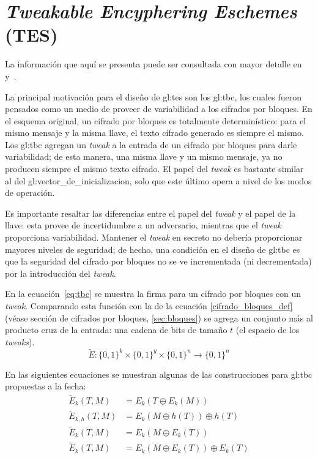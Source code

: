 %
%

\section{\textit{Tweakable Encyphering Eschemes} (TES)}
\label{sec:tes}

La información que aquí se presenta puede ser consultada con mayor detalle en
\cite{cifradores_de_disco} y~\cite{tweaks}.

La principal motivación para el diseño de \gls{gl:tes} son los \gls{gl:tbc},
los cuales fueron pensados como un medio de proveer de variabilidad a
los cifrados por bloques. En el esquema original, un cifrado por bloques es
totalmente determinístico: para el mismo mensaje y la misma llave, el texto
cifrado generado es siempre el mismo. Los \gls{gl:tbc} agregan un
\textit{tweak} a la entrada de un cifrado por bloques para darle
variabilidad; de esta manera, una misma llave y un mismo mensaje, ya no
producen siempre el mismo texto cifrado. El papel del \textit{tweak} es
bastante similar al del \gls{gl:vector_de_inicializacion}, solo que este
último opera a nivel de los modos de operación.

Es importante resaltar las diferencias entre el papel del \textit{tweak} y el
papel de la llave: esta provee de incertidumbre a un adversario,
mientras que el \textit{tweak} proporciona variabilidad. Mantener el
\textit{tweak} en secreto no debería proporcionar mayores niveles de
seguridad; de hecho, una condición en el diseño de \gls{gl:tbc} es que la
seguridad del cifrado por bloques no se ve incrementada (ni decrementada) por
la introducción del \textit{tweak}.

En la ecuación~\ref{eq:tbc} se muestra la firma para un cifrado por bloques
con un \textit{tweak}. Comparando esta función con la de la ecuación
\ref{cifrado_bloques_def} (véase sección de cifrados por bloques,
\ref{sec:bloques}) se agrega un conjunto más al producto cruz de la entrada:
una cadena de bits de tamaño $ t $ (el espacio de los \textit{tweaks}).
\begin{equation}
  \label{eq:tbc}
  \tilde{E}: \{0,1\}^k \times \{0,1\}^y \times \{0,1\}^n
  \longrightarrow \{0,1\}^n
\end{equation}

En las siguientes ecuaciones se muestran algunas de las construcciones para
\gls{gl:tbc} propuestas a la fecha:
\begin{align}
  \label{tbc_trivial}
  \tilde{E}_k(T, M) &= E_k(T \oplus E_k(M)) \\
  \label{tbc_lrw}
  \tilde{E}_{k, h}(T, M) &= E_k(M \oplus h(T)) \oplus h(T) \\
  \label{tbc_we}
  \tilde{E}_{k}(T, M) &= E_k(M \oplus E_k(T)) \\
  \label{tbc_xex}
  \tilde{E}_{k}(T, M) &= E_k(M \oplus E_k(T)) \oplus E_k(T)
\end{align}

